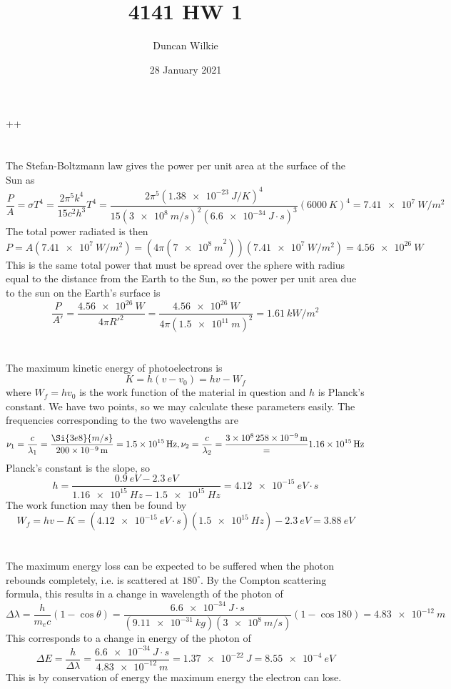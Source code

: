 ++\documentclass{article}
\title{4141 HW 1}
\author{Duncan Wilkie}
\date{28 January 2021}
\begin{document}
\maketitle

\section{}
The Stefan-Boltzmann law gives the power per unit area at the surface of the Sun as
\[\frac{P}{A}=\sigma T^4=\frac{2\pi^5k^4}{15c^2h^3}T^4=\frac{2\pi^5(\SI{1.38e-23}{J/K})^4}{15(\SI{3e8}{m/s})^2(\SI{6.6e-34}{J\cdot s})^3}(\SI{6000}{K})^4=\SI{7.41e7}{W/m^2}\]
The total power radiated is then
\[P=A(\SI{7.41e7}{W/m^2})=(4\pi(\SI{7e8}{m}^2))(\SI{7.41e7}{W/m^2})=\SI{4.56e26}{W}\]
This is the same total power that must be spread over the sphere with radius equal to the distance from the Earth to the Sun, so the power per unit area due to the sun on the Earth's surface is
\[\frac{P}{A'}=\frac{\SI{4.56e26}{W}}{4\pi R'^2}=\frac{\SI{4.56e26}{W}}{4\pi(\SI{1.5e11}{m})^2}=\SI{1.61}{kW/m^2}\]

\section{}
The maximum kinetic energy of photoelectrons is
\[K=h(v-v_0)=hv-W_f\]
where $W_f=hv_0$ is the work function of the material in question and $h$ is Planck's constant.
We have two points, so we may calculate these parameters easily. The frequencies corresponding to the two wavelengths are
\[\nu_1=\frac{c}{\lambda_1}=\frac{\Si{3e8}{m/s}}{\SI{200e-9}{m}}=\SI{1.5e15}{Hz}, \nu_2=\frac{c}{\lambda_2}=\frac{\SI{3e8}{\SI{258e-9}{m}}}=\SI{1.16e15}{Hz}\]
Planck's constant is the slope, so
\[h=\frac{\SI{0.9}{eV}-\SI{2.3}{eV}}{\SI{1.16e15}{Hz}-\SI{1.5e15}{Hz}}=\SI{4.12e-15}{eV\cdot s}\]
The work function may then be found by
\[W_f=hv-K=(\SI{4.12e-15}{eV\cdot s})(\SI{1.5e15}{Hz})-\SI{2.3}{eV}=\SI{3.88}{eV}\]

\section{}
The maximum energy loss can be expected to be suffered when the photon rebounds completely, i.e. is scattered at $180^\circ$. By the Compton scattering formula, this results in a change in wavelength of the photon of
\[\Delta \lambda=\frac{h}{m_ec}(1-\cos\theta)=\frac{\SI{6.6e-34}{J\cdot s}}{(\SI{9.11e-31}{kg})(\SI{3e8}{m/s})}(1-\cos{180})=\SI{4.83e-12}{m}\]
This corresponds to a change in energy of the photon of
\[\Delta E=\frac{h}{\Delta \lambda}=\frac{\SI{6.6e-34}{J\cdot s}}{\SI{4.83e-12}{m}}=\SI{1.37e-22}{J}=\SI{8.55e-4}{eV}\]
This is by conservation of energy the maximum energy the electron can lose.
\end{document}
